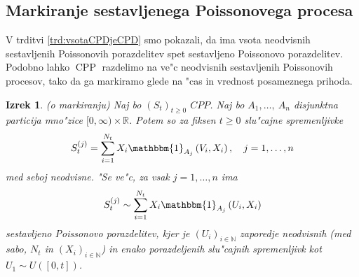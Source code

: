 \documentclass[12pt, a4paper, reqno]{amsart}
\theoremstyle{definition}
\theoremstyle{plain}
\newtheorem{izrek}[definicija]{Izrek}
\newcommand{\R}{\mathbb{R}}
\newcommand{\N}{\mathbb{N}}
\newcommand{\1}{\mathds{1}}
\DeclareMathOperator{\CPP}{CPP}
\begin{document}
%
%
%
%            

    \subsection{Markiranje sestavljenega Poissonovega procesa}
        V trditvi \ref{trd:vsotaCPDjeCPD} smo pokazali, da ima vsota neodvisnih sestavljenih Poissonovih porazdelitev 
        spet sestavljeno Poissonovo porazdelitev. Podobno lahko $\CPP$ razdelimo na ve"c neodvisnih
        sestavljenih Poissonovih procesov, tako da ga markiramo glede na "cas in vrednost posameznega 
        prihoda. 
 
        \begin{izrek}(o markiranju)
            Naj bo $(S_t)_{t\geq0}$ $CPP$. Naj bo $A_1, \dots, \ A_n$ disjunktna particija mno"zice 
            $[0, \infty) \times \R$. Potem so za fiksen $t\geq0$ slu"cajne spremenljivke
            \begin{equation}
                S_t^{(j)} = \sum_{i=1}^{N_t}X_i\mathbbm{1}_{A_j}\left(V_i, X_i\right), \quad j = 1, \dots, n
                \label{eq:markedCPP}
            \end{equation}
            med seboj neodvisne. "Se ve"c, za vsak $j = 1, \dots, n$ ima
            \begin{equation*}
                S_t^{(j)} \sim \sum_{i=1}^{N_t}X_i\mathbbm{1}_{A_j}\left(U_i, X_i\right)
            \end{equation*}
            sestavljeno Poissonovo porazdelitev, kjer je $(U_i)_{i\in\N}$ zaporedje neodvisnih (med sabo, $N_t$ in $(X_i)_{i\in\N}$) in enako porazdeljenih slu"cajnih spremenljivk
            kot $U_1\sim U\left([0, t]\right)$.
            \label{izr:MarkiranjeCPP}
        \end{izrek}
\end{document}
